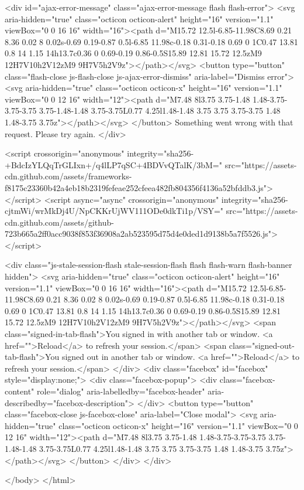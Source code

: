     
    

    <div id="ajax-error-message" class="ajax-error-message flash flash-error">
      <svg aria-hidden="true" class="octicon octicon-alert" height="16" version="1.1" viewBox="0 0 16 16" width="16"><path d="M15.72 12.5l-6.85-11.98C8.69 0.21 8.36 0.02 8 0.02s-0.69 0.19-0.87 0.5l-6.85 11.98c-0.18 0.31-0.18 0.69 0 1C0.47 13.81 0.8 14 1.15 14h13.7c0.36 0 0.69-0.19 0.86-0.5S15.89 12.81 15.72 12.5zM9 12H7V10h2V12zM9 9H7V5h2V9z"></path></svg>
      <button type="button" class="flash-close js-flash-close js-ajax-error-dismiss" aria-label="Dismiss error">
        <svg aria-hidden="true" class="octicon octicon-x" height="16" version="1.1" viewBox="0 0 12 16" width="12"><path d="M7.48 8l3.75 3.75-1.48 1.48-3.75-3.75-3.75 3.75-1.48-1.48 3.75-3.75L0.77 4.25l1.48-1.48 3.75 3.75 3.75-3.75 1.48 1.48-3.75 3.75z"></path></svg>
      </button>
      Something went wrong with that request. Please try again.
    </div>


      
      <script crossorigin="anonymous" integrity="sha256-+BdcIzYLQqTrGLIxn+/q4lLP7qSC+4BDVvQTalK/3bM=" src="https://assets-cdn.github.com/assets/frameworks-f8175c23360b42a4eb18b2319fefeae252cfeea482fb804356f4136a52bfddb3.js"></script>
      <script async="async" crossorigin="anonymous" integrity="sha256-cjtmWi/wrMkDj4U/NpCKKrUjWV111ODe0dkTi1p/VSY=" src="https://assets-cdn.github.com/assets/github-723b665a2ff0acc9038f853f36908a2ab523595d75d4e0ded1d9138b5a7f5526.js"></script>
      
      
      
      
      
      
    <div class="js-stale-session-flash stale-session-flash flash flash-warn flash-banner hidden">
      <svg aria-hidden="true" class="octicon octicon-alert" height="16" version="1.1" viewBox="0 0 16 16" width="16"><path d="M15.72 12.5l-6.85-11.98C8.69 0.21 8.36 0.02 8 0.02s-0.69 0.19-0.87 0.5l-6.85 11.98c-0.18 0.31-0.18 0.69 0 1C0.47 13.81 0.8 14 1.15 14h13.7c0.36 0 0.69-0.19 0.86-0.5S15.89 12.81 15.72 12.5zM9 12H7V10h2V12zM9 9H7V5h2V9z"></path></svg>
      <span class="signed-in-tab-flash">You signed in with another tab or window. <a href="">Reload</a> to refresh your session.</span>
      <span class="signed-out-tab-flash">You signed out in another tab or window. <a href="">Reload</a> to refresh your session.</span>
    </div>
    <div class="facebox" id="facebox" style="display:none;">
  <div class="facebox-popup">
    <div class="facebox-content" role="dialog" aria-labelledby="facebox-header" aria-describedby="facebox-description">
    </div>
    <button type="button" class="facebox-close js-facebox-close" aria-label="Close modal">
      <svg aria-hidden="true" class="octicon octicon-x" height="16" version="1.1" viewBox="0 0 12 16" width="12"><path d="M7.48 8l3.75 3.75-1.48 1.48-3.75-3.75-3.75 3.75-1.48-1.48 3.75-3.75L0.77 4.25l1.48-1.48 3.75 3.75 3.75-3.75 1.48 1.48-3.75 3.75z"></path></svg>
    </button>
  </div>
</div>

  </body>
</html>

